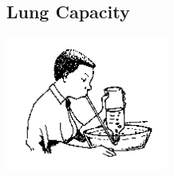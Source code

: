 \pagebreak


\subsection{Lung Capacity} 

\begin{center}
\includegraphics[width=0.4\textwidth]{./img/source/lung-capacity.png}
\end{center}

